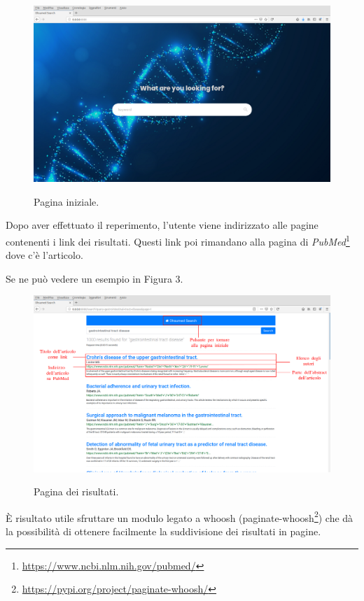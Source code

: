\documentclass[runningheads]{llncs}
\begin{document}
\begin{figure}%
    \centering
    {{\includegraphics[width=1\linewidth]{index} }}%
    \caption{Pagina iniziale.}%
\end{figure}

Dopo aver effettuato il reperimento, l'utente viene indirizzato alle pagine contenenti
i link dei risultati.
Questi link poi rimandano alla pagina di \emph{PubMed}\footnote{\url{https://www.ncbi.nlm.nih.gov/pubmed/}} dove c'\`e l'articolo.

Se ne pu\`o vedere un esempio in Figura 3.

\begin{figure}%
    \centering
    {{\includegraphics[width=1\linewidth]{risultati} }}%
    \caption{Pagina dei risultati.}%
\end{figure}

\`E risultato utile sfruttare un modulo legato a whoosh (paginate-whoosh\footnote{\url{https://pypi.org/project/paginate-whoosh/}})
che d\`a la possibilit\`a di ottenere facilmente la suddivisione dei risultati in pagine.
\end{document}
